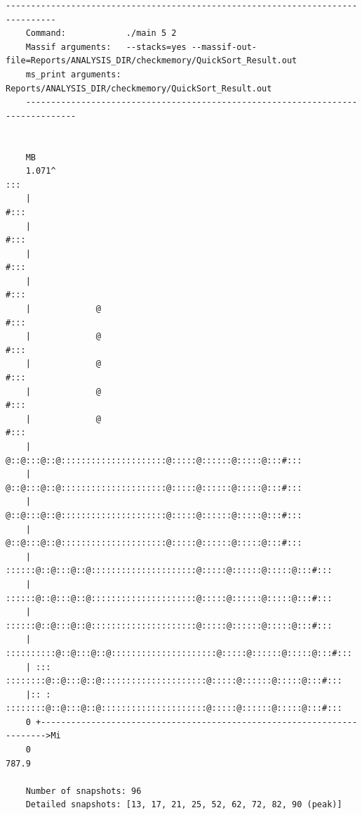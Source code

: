 \begin{lstlisting}[style=StyleResult, language=Result, basicstyle=\fontsize{9}{10}\selectfont\ttfamily, caption={Kiểm tra sử dụng bộ nhớ khi sử dụng QuickSort.}]
	--------------------------------------------------------------------------------
	Command:            ./main 5 2
	Massif arguments:   --stacks=yes --massif-out-file=Reports/ANALYSIS_DIR/checkmemory/QuickSort_Result.out
	ms_print arguments: Reports/ANALYSIS_DIR/checkmemory/QuickSort_Result.out
	--------------------------------------------------------------------------------
	
	
	MB
	1.071^                                                                :::
	|                                                                    #:::
	|                                                                    #:::
	|                                                                    #:::
	|                                                                    #:::
	|             @                                                      #:::
	|             @                                                      #:::
	|             @                                                      #:::
	|             @                                                      #:::
	|             @                                                      #:::
	|             @::@:::@::@:::::::::::::::::::::@:::::@::::::@:::::@:::#:::
	|             @::@:::@::@:::::::::::::::::::::@:::::@::::::@:::::@:::#:::
	|             @::@:::@::@:::::::::::::::::::::@:::::@::::::@:::::@:::#:::
	|             @::@:::@::@:::::::::::::::::::::@:::::@::::::@:::::@:::#:::
	|       ::::::@::@:::@::@:::::::::::::::::::::@:::::@::::::@:::::@:::#:::
	|       ::::::@::@:::@::@:::::::::::::::::::::@:::::@::::::@:::::@:::#:::
	|       ::::::@::@:::@::@:::::::::::::::::::::@:::::@::::::@:::::@:::#:::
	|   ::::::::::@::@:::@::@:::::::::::::::::::::@:::::@::::::@:::::@:::#:::
	| ::: ::::::::@::@:::@::@:::::::::::::::::::::@:::::@::::::@:::::@:::#:::
	|:: : ::::::::@::@:::@::@:::::::::::::::::::::@:::::@::::::@:::::@:::#:::
	0 +----------------------------------------------------------------------->Mi
	0                                                                   787.9
	
	Number of snapshots: 96
	Detailed snapshots: [13, 17, 21, 25, 52, 62, 72, 82, 90 (peak)]
	
\end{lstlisting}

